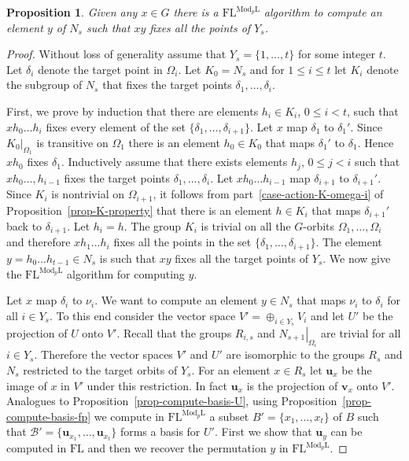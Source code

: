 \documentclass[11pt]{madras}%
\newtheorem{proposition}[theorem]{Proposition}
\theoremstyle{remark}
\newcommand{\ModkL}[1]{{\ensuremath{\mathrm{Mod}_{#1}\mathrm{L}}}}
\newcommand{\pr}[2]{{\ensuremath{\left.{#1}\right\vert_{#2}}}}
\begin{document}
\begin{proposition}
  Given any $x \in G$ there is a $\mathrm{FL}^{\ModkL{p}}$ algorithm
  to compute an element $y$ of $N_s$ such that $xy$ fixes all the
  points of $Y_s$.
\end{proposition}
\begin{proof}
  Without loss of generality assume that $Y_s = \{ 1,\ldots,t \}$ for
  some integer $t$. Let $\delta_i$ denote the target point in
  $\Omega_i$. Let $K_0 = N_s$ and for $1 \leq i \leq t$ let $K_i$
  denote the subgroup of $N_s$ that fixes the target points
  $\delta_1,\ldots,\delta_i$. 

  First, we prove by induction that there are elements $h_i \in K_i$,
  $0 \leq i < t$, such that $xh_0 \ldots h_i$ fixes every element of
  the set $\{ \delta_1,\ldots,\delta_{i+1} \}$.  Let $x$ map
  $\delta_1$ to $\delta_1'$.  Since $\pr{K_0}{\Omega_1}$ is transitive
  on $\Omega_1$ there is an element $h_0 \in K_0$ that maps
  $\delta_1'$ to $\delta_1$. Hence $xh_0$ fixes $\delta_1$.
  Inductively assume that there exists elements $h_j$, $0 \leq j < i$
  such that $xh_0\ldots,h_{i-1}$ fixes the target points
  $\delta_1,\ldots,\delta_i$. Let $xh_0\ldots h_{i-1}$ map
  $\delta_{i+1}$ to $\delta_{i+1}'$. Since $K_i$ is nontrivial on
  $\Omega_{i+1}$, it follows from part~\ref{case-action-K-omega-i} of
  Proposition~\ref{prop-K-property} that there is an element $h \in
  K_i$ that maps $\delta_{i+1}'$ back to $\delta_{i+1}$. Let $h_i =
  h$. The group $K_i$ is trivial on all the $G$-orbits
  $\Omega_1,\ldots,\Omega_i$ and therefore $xh_1\ldots h_i$ fixes all
  the points in the set $\{ \delta_1,\ldots,\delta_{i+1} \}$.  The
  element $y = h_0\ldots h_{t-1} \in N_s$ is such that $xy$ fixes all
  the target points of $Y_s$.  We now give the
  $\mathrm{FL}^{\ModkL{p}}$ algorithm for computing $y$.

  Let $x$ map $\delta_i$ to $\nu_i$. We want to compute an element $y
  \in N_s$ that maps $\nu_i$ to $\delta_i$ for all $i \in Y_s$.  To
  this end consider the vector space $V' = \oplus_{i\in Y_s} V_i$ and
  let $U'$ be the projection of $U$ onto $V'$. Recall that the groups
  $R_{i,s}$ and $\pr{N_{s+1}}{\Omega_i}$ are trivial for all $i \in
  Y_s$. Therefore the vector spaces $V'$ and $U'$ are isomorphic to
  the groups $R_s$ and $N_s$ restricted to the target orbits of $Y_s$.
  For an element $x \in R_s$ let $\mathbf{u}_x$ be the image of $x$ in
  $V'$ under this restriction.  In fact $\mathbf{u}_x$ is the
  projection of $\mathbf{v}_x$ onto $V'$.  Analogues to
  Proposition~\ref{prop-compute-basis-U}, using
  Proposition~\ref{prop-compute-basis-fp} we compute in
  $\mathrm{FL}^{\ModkL{p}}$ a subset $B' = \{ x_1,\ldots,x_t \}$ of
  $B$ such that $\mathcal{B}' = \{ \mathbf{u}_{x_1}, \ldots,
  \mathbf{u}_{x_t} \}$ forms a basis for $U'$. First we show that
  $\mathbf{u}_y$ can be computed in $\mathrm{FL}$ and then we recover
  the permutation $y$ in $\mathrm{FL}^{\ModkL{p}}$.


\end{proof}
\end{document}
